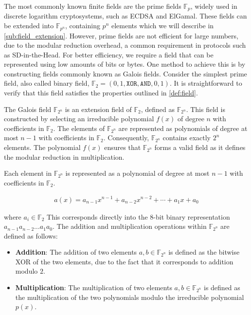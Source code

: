 \documentclass[11pt]{report}
\theoremstyle{definition}
\theoremstyle{plain}
\begin{document}
\noindent
The most commonly known finite fields are the prime fields $\mathbb{F}_p$, widely used in discrete logarithm cryptosystems, such as ECDSA and ElGamal. These fields can be extended into $\mathbb{F}_{p^n}$, containing $p^n$ elements which we will describe in \autoref{sub:field_extension}. However, prime fields are not efficient for large numbers, due to the modular reduction overhead, a common requirement in protocols such as SD-in-the-Head. For better efficiency, we require a field that can be represented using low amounts of bits or bytes. One method to achieve this is by constructing fields commonly known as Galois fields. Consider the simplest prime field, also called binary field, $\mathbb{F}_2 = ({0,1}, \texttt{XOR}, \texttt{AND}, 0, 1)$. It is straightforward to verify that this field satisfies the properties outlined in \autoref{def:field}.

The Galois field $\mathbb{F}_{2^n}$ is an extension field of $\mathbb{F}_2$, defined as $\mathbb{F}_{2^n}$. This field is constructed by selecting an irreducible polynomial $f(x)$ of degree $n$ with coefficients in $\mathbb{F}_2$. The elements of $\mathbb{F}_{2^n}$ are represented as polynomials of degree at most $n-1$ with coefficients in $\mathbb{F}_2$. Consequently, $\mathbb{F}_{2^n}$ contains exactly $2^n$ elements. The polynomial $f(x)$ ensures that $\mathbb{F}_{2^n}$ forms a valid field as it defines the modular reduction in multiplication.

Each element in $\mathbb{F}_{2^n}$ is represented as a polynomial of degree at most $n-1$ with coefficients in $\mathbb{F}_2$.

\begin{align*}
  a(x) = a_{n-1}x^{n-1} + a_{n-2}x^{n-2} + \cdots + a_1x + a_0
\end{align*}

\noindent
where $a_i \in \mathbb{F}_2$ This corresponds directly into the 8-bit binary representation $a_{n-1}a_{n-2}\dots a_1a_0$. The addition and multiplication operations within $\mathbb{F}_{2^n}$ are defined as follows:

\begin{itemize}
  \item \textbf{Addition}: The addition of two elements $a,b \in \mathbb{F}_{2^n}$ is defined as the bitwise XOR of the two elements, due to the fact that it corresponds to addition modulo $2$.
  \item \textbf{Multiplication}: The multiplication of two elements $a,b \in \mathbb{F}_{2^n}$ is defined as the multiplication of the two polynomials modulo the irreducible polynomial $p(x)$.
\end{itemize}
\end{document}
